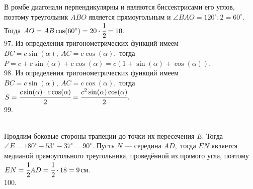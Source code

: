\documentclass[12pt]{article}
\begin{document}
В ромбе диагонали перпендикулярны и являются биссектрисами его углов, поэтому треугольник $ABO$ является прямоугольным и $\angle BAO=120^\circ:2=60^\circ.$ Тогда $AO=AB\cos(60^\circ)=20\cdot\cfrac{1}{2}=10.$\\
97. Из определения тригонометрических функций имеем $BC=c\sin(\alpha),\ AC=c\cos(\alpha),$ тогда $P=c+c\sin(\alpha)+c\cos(\alpha)=c(1+\sin(\alpha)+\cos(\alpha)).$\\
98. Из определения тригонометрических функций имеем $BC=c\sin(\alpha),\ AC=c\cos(\alpha),$ тогда $S=\cfrac{c\sin(\alpha)\cdot c\cos(\alpha)}{2}=\cfrac{c^2\sin(\alpha)\cos(\alpha)}{2}.$\\
99. \begin{figure}[ht!]
\end{figure}\\
Продлим боковые стороны трапеции до точки их пересечения $E.$ Тогда $\angle E=180^\circ-53^\circ-37^\circ=90^\circ.$ Пусть $N$ --- середина $AD,$ тогда $EN$ является медианой прямоугольного треугольника, проведённой из прямого угла, поэтому $EN=\cfrac{1}{2}AD=\cfrac{1}{2}\cdot18=9$см.\\
100. \begin{figure}[ht!]
\end{figure}\\
\end{document}
